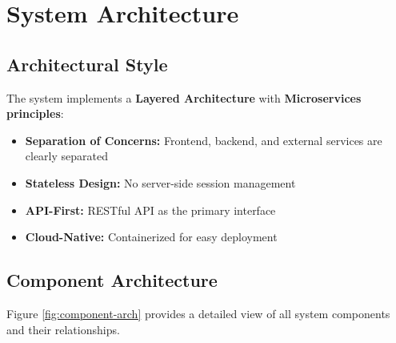 \documentclass[12pt,a4paper]{report}
\begin{document}
\chapter{System Architecture}

\section{Architectural Style}

The system implements a \textbf{Layered Architecture} with \textbf{Microservices principles}:

\begin{itemize}[leftmargin=*]
    \item \textbf{Separation of Concerns:} Frontend, backend, and external services are clearly separated
    \item \textbf{Stateless Design:} No server-side session management
    \item \textbf{API-First:} RESTful API as the primary interface
    \item \textbf{Cloud-Native:} Containerized for easy deployment
\end{itemize}

\section{Component Architecture}

Figure \ref{fig:component-arch} provides a detailed view of all system components and their relationships.
\end{document}
